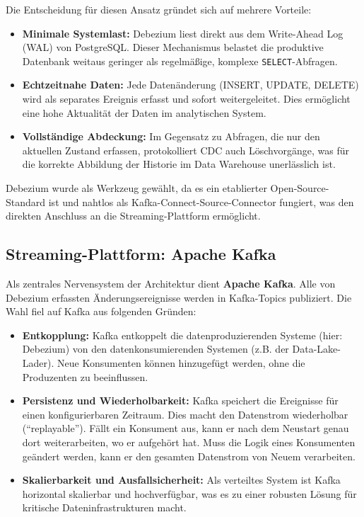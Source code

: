 \documentclass[
    12pt,               
    a4paper,        
    ngerman            
]{scrartcl}
\begin{document}
Die Entscheidung für diesen Ansatz gründet sich auf mehrere Vorteile:
\begin{itemize}
    \item \textbf{Minimale Systemlast:} Debezium liest direkt aus dem Write-Ahead Log (WAL) von PostgreSQL. Dieser Mechanismus belastet die produktive Datenbank weitaus geringer als regelmäßige, komplexe \texttt{SELECT}-Abfragen.
    \item \textbf{Echtzeitnahe Daten:} Jede Datenänderung (INSERT, UPDATE, DELETE) wird als separates Ereignis erfasst und sofort weitergeleitet. Dies ermöglicht eine hohe Aktualität der Daten im analytischen System.
    \item \textbf{Vollständige Abdeckung:} Im Gegensatz zu Abfragen, die nur den aktuellen Zustand erfassen, protokolliert CDC auch Löschvorgänge, was für die korrekte Abbildung der Historie im Data Warehouse unerlässlich ist.
\end{itemize}
Debezium wurde als Werkzeug gewählt, da es ein etablierter Open-Source-Standard ist und nahtlos als Kafka-Connect-Source-Connector fungiert, was den direkten Anschluss an die Streaming-Plattform ermöglicht.

\subsection{Streaming-Plattform: Apache Kafka}
\label{subsec:kafka}

Als zentrales Nervensystem der Architektur dient \textbf{Apache Kafka}. Alle von Debezium erfassten Änderungsereignisse werden in Kafka-Topics publiziert. Die Wahl fiel auf Kafka aus folgenden Gründen:
\begin{itemize}
    \item \textbf{Entkopplung:} Kafka entkoppelt die datenproduzierenden Systeme (hier: Debezium) von den datenkonsumierenden Systemen (z.B. der Data-Lake-Lader). Neue Konsumenten können hinzugefügt werden, ohne die Produzenten zu beeinflussen.
    \item \textbf{Persistenz und Wiederholbarkeit:} Kafka speichert die Ereignisse für einen konfigurierbaren Zeitraum. Dies macht den Datenstrom wiederholbar (``replayable''). Fällt ein Konsument aus, kann er nach dem Neustart genau dort weiterarbeiten, wo er aufgehört hat. Muss die Logik eines Konsumenten geändert werden, kann er den gesamten Datenstrom von Neuem verarbeiten.
    \item \textbf{Skalierbarkeit und Ausfallsicherheit:} Als verteiltes System ist Kafka horizontal skalierbar und hochverfügbar, was es zu einer robusten Lösung für kritische Dateninfrastrukturen macht.
\end{itemize}
\end{document}
